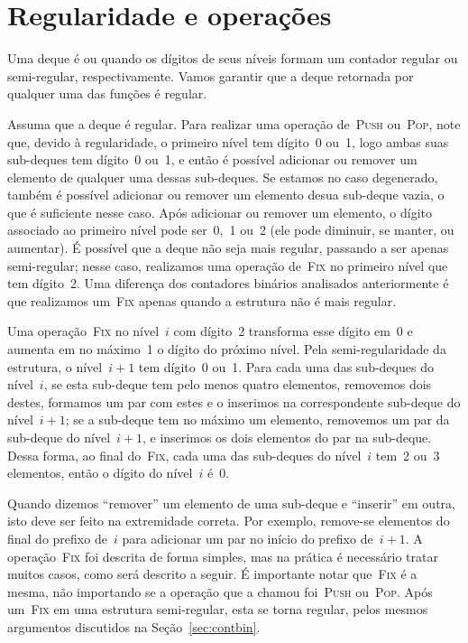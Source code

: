 \documentclass[../../main.tex]{subfiles}
\begin{document}
\section{Regularidade e operações} \label{sec:reg_op}

Uma deque é  ou  quando os dígitos de seus níveis formam um contador regular ou semi-regular, respectivamente. Vamos garantir que a deque retornada por qualquer uma das funções é regular.

Assuma que a deque é regular. Para realizar uma operação de~\textsc{Push} ou~\textsc{Pop}, note que, devido à regularidade, o primeiro nível tem dígito~0 ou~1, logo ambas suas sub-deques tem dígito~0 ou~1, e então é possível adicionar ou remover um elemento de qualquer uma dessas sub-deques. Se estamos no caso degenerado, também é possível adicionar ou remover um elemento desua sub-deque vazia, o que é suficiente nesse caso.
Após adicionar ou remover um elemento, o dígito associado ao primeiro nível pode ser~0,~1 ou~2 (ele pode diminuir, se manter, ou aumentar). É possível que a deque não seja mais regular, passando a ser apenas semi-regular; nesse caso, realizamos uma operação de~\textsc{Fix} no primeiro nível que tem dígito~2. Uma diferença dos contadores binários analisados anteriormente é que realizamos um~\textsc{Fix} apenas quando a estrutura não é mais regular.

Uma operação~\textsc{Fix} no nível~$i$ com dígito~2 transforma esse dígito em~0 e aumenta em no máximo~1 o dígito do próximo nível. Pela semi-regularidade da estrutura, o nível~$i+1$ tem dígito~0 ou~1. Para cada uma das sub-deques do nível~$i$, se esta sub-deque tem pelo menos quatro elementos, removemos dois destes, formamos um par com estes e o inserimos na correspondente sub-deque do nível~$i+1$; se a sub-deque tem no máximo um elemento, removemos um par da sub-deque do nível~$i+1$, e inserimos os dois elementos do par na sub-deque. Dessa forma, ao final do~\textsc{Fix}, cada uma das sub-deques do nível~$i$ tem~2 ou~3 elementos, então o dígito do nível~$i$ é~0.

Quando dizemos ``remover'' um elemento de uma sub-deque e ``inserir'' em outra, isto deve ser feito na extremidade correta. Por exemplo, remove-se elementos do final do prefixo de~$i$ para adicionar um par no início do prefixo de~$i+1$. A operação~\textsc{Fix} foi descrita de forma simples, mas na prática é necessário tratar muitos casos, como será descrito a seguir. É importante notar que~\textsc{Fix} é a mesma, não importando se a operação que a chamou foi~\textsc{Push} ou~\textsc{Pop}. Após um~\textsc{Fix} em uma estrutura semi-regular, esta se torna regular, pelos mesmos argumentos discutidos na Seção~\ref{sec:contbin}.
\end{document}
